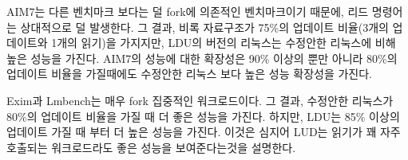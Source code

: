 AIM7는 다른 벤치마크 보다는 덜 fork에 의존적인 벤치마크이기 때문에, 리드 명령어는 상대적으로 
덜 발생한다. 
그 결과, 비록 자료구조가 75\%의 업데이트 비율(3개의 업데이트와 1개의 읽기)을 가지지만, 
LDU의 버전의 리눅스는 수정안한 리눅스에 비해 높은 성능을 가진다. 
AIM7의 성능에 대한 확장성은 90\% 이상의 뿐만 아니라 80\%의 업데이트 비율을 가질때에도 수정안한 
리눅스 보다 높은 성능 확장성을 가진다.  

Exim과 Lmbench는 매우 fork 집중적인 워크로드이다. 
그 결과, 수정안한 리눅스가 80\%의 업데이트 비율을 가질 때 더 좋은 성능을 가진다.
하지만, LDU는 85\% 이상의 업데이트 가질 때 부터 더 높은 성능을 가진다.
이것은 심지어 LUD는 읽기가 꽤 자주 호출되는 워크로드라도 좋은 성능을 보여준다는것을 설명한다. 
 

